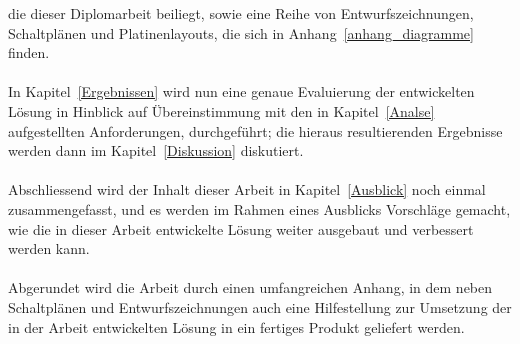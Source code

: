 die dieser Diplomarbeit beiliegt, sowie eine Reihe von Entwurfszeichnungen, Schaltplänen
und Platinenlayouts, die sich in Anhang~\ref{anhang_diagramme} finden.\\
\\
In Kapitel~\ref{Ergebnissen} wird nun eine genaue Evaluierung der entwickelten Lösung 
in Hinblick auf Übereinstimmung mit den in Kapitel~\ref{Analse} aufgestellten Anforderungen, 
durchgeführt; die hieraus resultierenden Ergebnisse werden dann im Kapitel~\ref{Diskussion}
diskutiert.\\
\\
Abschliessend wird der Inhalt dieser Arbeit in Kapitel~\ref{Ausblick} noch einmal zusammengefasst,
und es werden im Rahmen eines Ausblicks Vorschläge gemacht, wie die in dieser Arbeit entwickelte
Lösung weiter ausgebaut und verbessert werden kann.\\
\\
Abgerundet wird die Arbeit durch einen umfangreichen Anhang, in dem neben Schaltplänen und 
Entwurfszeichnungen auch eine Hilfestellung zur Umsetzung der in der Arbeit entwickelten
Lösung in ein fertiges Produkt geliefert werden.
